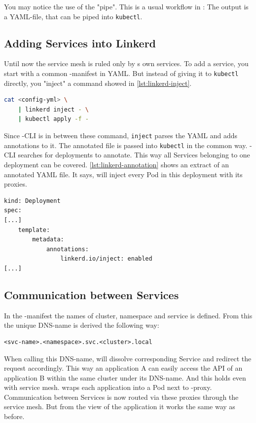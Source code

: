 You may notice the use of the "pipe". 
This is a usual workflow in \linkerd{}: The output is a YAML-file, that can be piped into \lstinline|kubectl|.

\subsection{Adding Services into Linkerd}
Until now the service mesh is ruled only by \linkerd{}s own services.
To add a service, you start with a common \kubernetes{}-manifest in YAML.
But instead of giving it to \lstinline|kubectl| directly, you "inject" a \linkerd{} command showed in \autoref{lst:linkerd-inject}.
\begin{lstlisting}[language=bash,caption={Inject \textsc{Linkerd}-annotation into manifest.}, label={lst:linkerd-inject}]
cat <config-yml> \
	| linkerd inject - \
	| kubectl apply -f -
\end{lstlisting}
Since \linkerd{}-CLI is in between these command, \lstinline|inject| parses the YAML and adds annotations to it.
The annotated file is passed into \lstinline|kubectl| in the common way.
\linkerd{}-CLI searches for deployments to annotate.
This way all Services belonging to one deployment can be covered.
\autoref{lst:linkerd-annotation} shows an extract of an annotated YAML file.
It says, \linkerd{} will inject every Pod in this deployment with its proxies.

\begin{lstlisting}[caption={Extract of a \kubernetes{}-manifest annotated by \textsc{Linkerd}.}, label={lst:linkerd-annotation}]
kind: Deployment
spec:
[...]
	template:
		metadata:
			annotations:
				linkerd.io/inject: enabled
[...]				
\end{lstlisting}
 
\subsection{Communication between Services}

In the \kubernetes{}-manifest the names of cluster, namespace and service is defined.
From this the unique DNS-name is derived the following way:

\begin{lstlisting}[caption={DNS-name of a local service in \kubernetes{}.}, label={lst:k8s-dns}]
<svc-name>.<namespace>.svc.<cluster>.local
\end{lstlisting}

When calling this DNS-name, \kubernetes{} will dissolve corresponding Service and redirect the request accordingly.
This way an application A can easily access the API of an application B within the same cluster under its DNS-name.
And this holds even with service mesh.
\linkerd{} wraps each application into a Pod next to \linkerd{}-proxy.
Communication between Services is now routed via these proxies through the service mesh.
But from the view of the application it works the same way as before.

